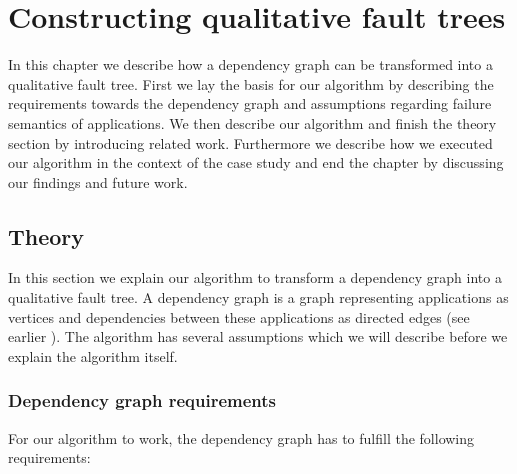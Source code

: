 
\chapter{Constructing qualitative fault trees}
\label{chapter:fault_trees}

In this chapter we describe how a dependency graph can be transformed into a qualitative fault tree. First we lay the basis for our algorithm by describing the requirements towards the dependency graph and assumptions regarding failure semantics of applications. We then describe our algorithm and finish the theory section by introducing related work. Furthermore we describe how we executed our algorithm in the context of the case study and end the chapter by discussing our findings and future work.

\section{Theory}

In this section we explain our algorithm to transform a dependency graph into a qualitative fault tree. A dependency graph is a graph representing applications as vertices and dependencies between these applications as directed edges (see earlier ). The algorithm has several assumptions which we will describe before we explain the algorithm itself.

\subsection{Dependency graph requirements}
\label{section:fault_tree_graph_req}

For our algorithm to work, the dependency graph has to fulfill the following requirements:

